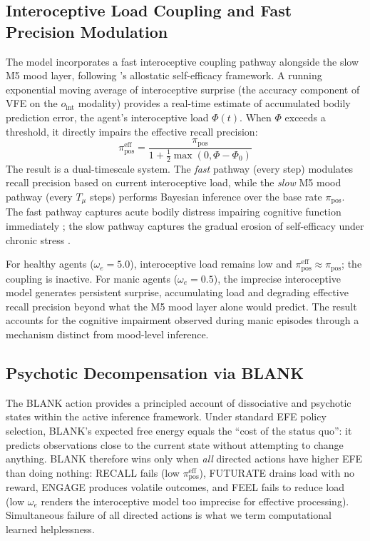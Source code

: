 \documentclass[11pt,a4paper]{article}
\begin{document}
\subsection{Interoceptive Load Coupling and Fast Precision Modulation}

The model incorporates a fast interoceptive coupling pathway alongside the slow M5 mood layer, following \citet{stephan2016allostatic}'s allostatic self-efficacy framework. A running exponential moving average of interoceptive surprise (the accuracy component of VFE on the $o_{\text{int}}$ modality) provides a real-time estimate of accumulated bodily prediction error, the agent's interoceptive load $\Phi(t)$. When $\Phi$ exceeds a threshold, it directly impairs the effective recall precision:
\begin{equation}
    \pi_{\text{pos}}^{\text{eff}} = \frac{\pi_{\text{pos}}}{1 + \tfrac{1}{2}\max(0, \Phi - \Phi_0)}
\end{equation}
The result is a dual-timescale system. The \emph{fast} pathway (every step) modulates recall precision based on current interoceptive load, while the \emph{slow} M5 mood pathway (every $T_\mu$ steps) performs Bayesian inference over the base rate $\pi_{\text{pos}}$. The fast pathway captures acute bodily distress impairing cognitive function immediately \citep{smith2020bayesian}; the slow pathway captures the gradual erosion of self-efficacy under chronic stress \citep{stephan2016allostatic}.

For healthy agents ($\omega_e = 5.0$), interoceptive load remains low and $\pi_{\text{pos}}^{\text{eff}} \approx \pi_{\text{pos}}$; the coupling is inactive. For manic agents ($\omega_e = 0.5$), the imprecise interoceptive model generates persistent surprise, accumulating load and degrading effective recall precision beyond what the M5 mood layer alone would predict. The result accounts for the cognitive impairment observed during manic episodes through a mechanism distinct from mood-level inference.

\subsection{Psychotic Decompensation via BLANK}

The BLANK action provides a principled account of dissociative and psychotic states within the active inference framework. Under standard EFE policy selection, BLANK's expected free energy equals the ``cost of the status quo'': it predicts observations close to the current state without attempting to change anything. BLANK therefore wins only when \emph{all} directed actions have higher EFE than doing nothing: RECALL fails (low $\pi_{\text{pos}}^{\text{eff}}$), FUTURATE drains load with no reward, ENGAGE produces volatile outcomes, and FEEL fails to reduce load (low $\omega_e$ renders the interoceptive model too imprecise for effective processing). Simultaneous failure of all directed actions is what we term computational learned helplessness.
\end{document}
